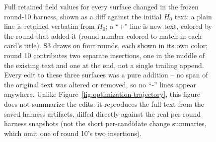 \begin{figure}[p]
\vspace{4pt}
\begin{tcolorbox}[
  enhanced, colback=white, colframe=black!35, boxrule=0.5pt,
  arc=2pt, left=3pt, right=3pt, top=3pt, bottom=4pt,
  colbacktitle=black!8, coltitle=black, fonttitle=\bfseries\small,
  title={S4---verification instruction (promoted round \rbadge{r7fill}{7})}
]
\end{tcolorbox}

\caption{Full retained field values for every surface changed in the frozen
round-10 harness, shown as a diff against the initial $H_0$ text: a plain line
is retained verbatim from $H_0$; a ``+'' line is new text, colored by the
round that added it (round number colored to match in each card's title).
S3 draws on four rounds, each shown in its own color; round 10 contributes
two separate insertions, one in the middle of the existing text and one at
the end, not a single trailing append. Every edit to these three surfaces was
a pure addition -- no span of the original text was altered or removed, so
no ``-'' lines appear anywhere. Unlike Figure~\ref{fig:optimization-trajectory},
this figure does not summarize the edits: it reproduces the full text from
the saved harness artifacts, diffed directly against the real per-round
harness snapshots (not the short per-candidate change summaries, which omit
one of round 10's two insertions).}
\label{fig:final-surface-edits}
\end{figure}
